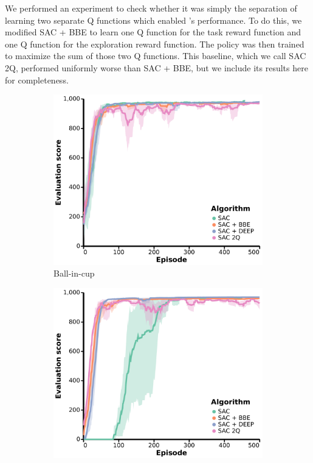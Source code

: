 \begin{subappendices}
{} \label{sec:benchmark_results_appendix}

We performed an experiment to check whether it was simply the separation of learning two separate Q functions which enabled \algshort{}'s performance.
To do this, we modified SAC + BBE to learn one Q function for the task reward function and one Q function for the exploration reward function.
The policy was then trained to maximize the sum of those two Q functions.
This baseline, which we call SAC 2Q, performed uniformly worse than SAC + BBE, but we include its results here for completeness.


\begin{figure}[h]
    \centering
    \begin{subfigure}[b]{0.24\textwidth}
        \centering
        \includegraphics[width=\textwidth]{figures/deep/neurips_SAC2Q_ball_in_cup.pdf}
        \caption{Ball-in-cup}
    \end{subfigure}
    \begin{subfigure}[b]{0.24\textwidth}
        \centering
        \includegraphics[width=\textwidth]{figures/deep/neurips_SAC2Q_ball_in_cup_explore.pdf}

\end{subfigure}
\end{figure}
\end{subappendices}
